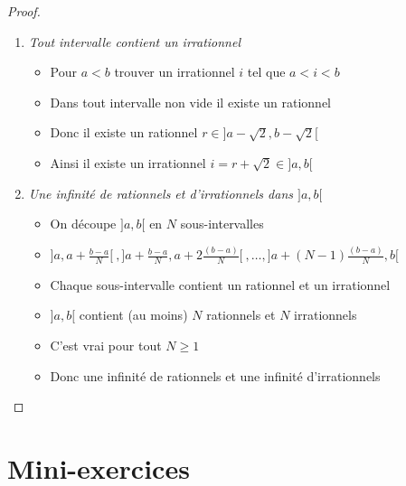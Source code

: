 \begin{frame}
\begin{proof}
\begin{enumerate}[<+->]
  \setcounter{enumi}{\thesaveenumi}
  \item \emph{Tout intervalle contient un irrationnel}
  \begin{itemize}[<+->]
    \item Pour $a<b$ trouver un irrationnel $i$ tel que $a<i<b$
    \item Dans tout intervalle non vide il existe un rationnel
    \item Donc il existe un rationnel $r \in ]a-\sqrt{2},b-\sqrt{2}[$
    \item Ainsi il existe un irrationnel  $i=r+\sqrt{2}\in ]a,b[$
  \end{itemize}



  \item \emph{Une infinité de rationnels et d'irrationnels dans $]a,b[$}

  \begin{itemize}[<+->]
    \item On découpe $]a,b[$ en $N$ sous-intervalles
    \item $ \big]a,a+\frac{b-a}{N}\big[\ , 
\big]a+\frac{b-a}{N},a+2\frac{(b-a)}{N}\big[\ , \ldots, 
\big]a+(N-1)\frac{(b-a)}{N},b\big[$
    \item Chaque sous-intervalle contient un rationnel et un irrationnel
    \item $]a,b[$ contient (au moins) $N$ rationnels et $N$ irrationnels
    \item C'est vrai pour tout $N \ge 1$
    \item Donc une infinité de rationnels et une infinité d'irrationnels
  \end{itemize}
\end{enumerate}
\end{proof}
\end{frame}

\section*{Mini-exercices}



